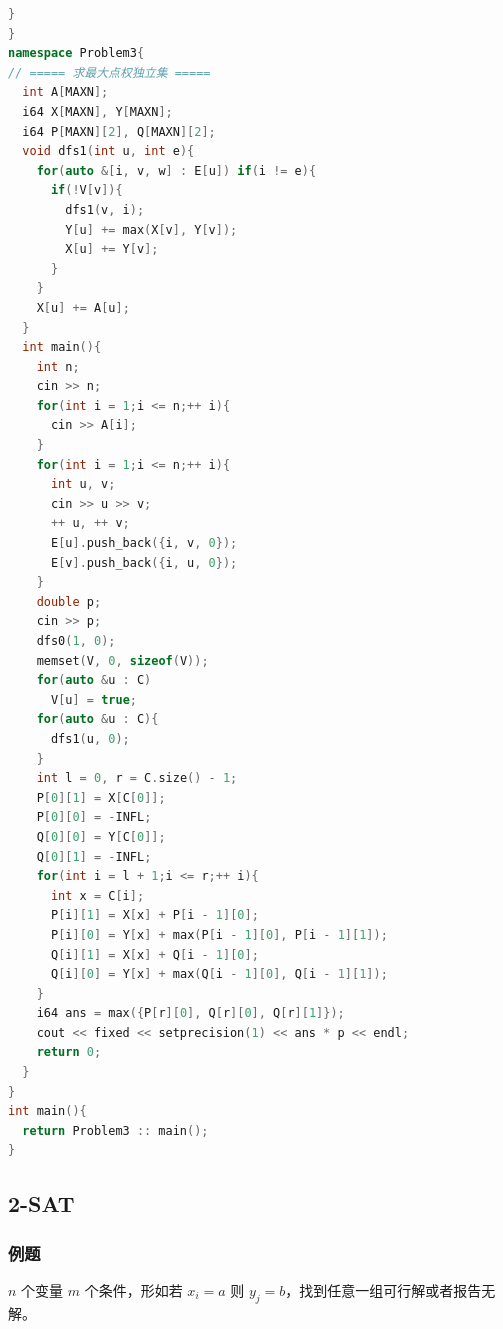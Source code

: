 \documentclass[10pt]{ctexart}
\begin{document}
\begin{multicols}{3}
\begin{lstlisting}[language={C++}]
  }
}
namespace Problem3{
// ===== 求最大点权独立集 =====
  int A[MAXN];
  i64 X[MAXN], Y[MAXN];
  i64 P[MAXN][2], Q[MAXN][2];
  void dfs1(int u, int e){
    for(auto &[i, v, w] : E[u]) if(i != e){
      if(!V[v]){
        dfs1(v, i);
        Y[u] += max(X[v], Y[v]);
        X[u] += Y[v];
      }
    }
    X[u] += A[u];
  }
  int main(){
    int n;
    cin >> n;
    for(int i = 1;i <= n;++ i){
      cin >> A[i];
    }
    for(int i = 1;i <= n;++ i){
      int u, v;
      cin >> u >> v;
      ++ u, ++ v;
      E[u].push_back({i, v, 0});
      E[v].push_back({i, u, 0});
    }
    double p;
    cin >> p;
    dfs0(1, 0);
    memset(V, 0, sizeof(V));
    for(auto &u : C)
      V[u] = true;
    for(auto &u : C){
      dfs1(u, 0);
    }
    int l = 0, r = C.size() - 1;
    P[0][1] = X[C[0]];
    P[0][0] = -INFL;
    Q[0][0] = Y[C[0]];
    Q[0][1] = -INFL;
    for(int i = l + 1;i <= r;++ i){
      int x = C[i];
      P[i][1] = X[x] + P[i - 1][0];
      P[i][0] = Y[x] + max(P[i - 1][0], P[i - 1][1]);
      Q[i][1] = X[x] + Q[i - 1][0];
      Q[i][0] = Y[x] + max(Q[i - 1][0], Q[i - 1][1]);
    }
    i64 ans = max({P[r][0], Q[r][0], Q[r][1]});
    cout << fixed << setprecision(1) << ans * p << endl;
    return 0;
  }
}
int main(){
  return Problem3 :: main();
}
\end{lstlisting}

    \subsection{2-SAT}\label{sat}

    \subsubsection{例题}\label{ux4f8bux9898-5}

    \(n\) 个变量 \(m\) 个条件，形如若 \(x_i = a\) 则
    \(y_j = b\)，找到任意一组可行解或者报告无解。


\end{multicols}
\end{document}
